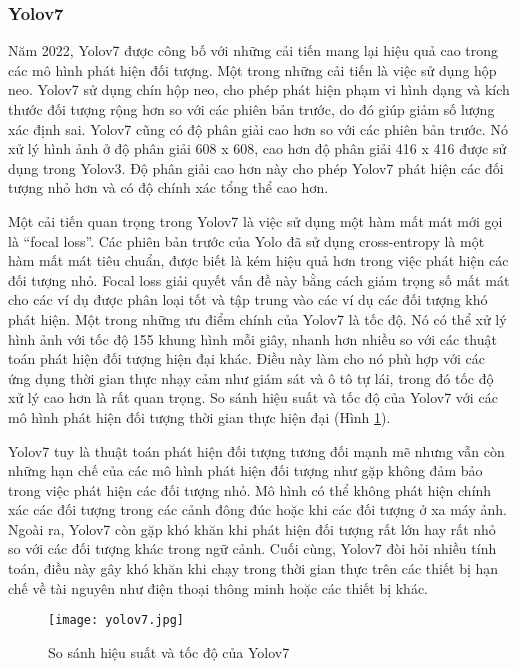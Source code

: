 \documentclass[../the.tex]{subfiles}
\begin{document}
\subsubsection{Yolov7} 
{\fontsize{13}{12} \selectfont 
Năm 2022, Yolov7 \cite{wang2022yolov7} được công bố với những cải tiến mang lại hiệu quả cao trong các mô hình phát hiện đối tượng. Một trong những cải tiến là việc sử dụng hộp neo.
Yolov7 sử dụng chín hộp neo, cho phép phát hiện phạm vi hình dạng và kích thước đối tượng rộng hơn so với các phiên bản trước, do đó giúp giảm số lượng xác định sai.
Yolov7 cũng có độ phân giải cao hơn so với các phiên bản trước. Nó xử lý hình ảnh ở độ phân giải 608 x 608, cao hơn độ phân giải 416 x 416 được sử dụng trong Yolov3. Độ phân giải cao hơn này cho phép Yolov7 phát hiện các đối tượng nhỏ hơn và có độ chính xác tổng thể cao hơn.

Một cải tiến quan trọng trong Yolov7 là việc sử dụng một hàm mất mát mới gọi là “focal loss”. Các phiên bản trước của Yolo đã sử dụng cross-entropy là một hàm mất mát tiêu chuẩn, được biết là kém hiệu quả hơn trong việc phát hiện các đối tượng nhỏ. Focal loss giải quyết vấn đề này bằng cách giảm trọng số mất mát cho các ví dụ được phân loại tốt và tập trung vào các ví dụ các đối tượng khó phát hiện.
Một trong những ưu điểm chính của Yolov7 là tốc độ. Nó có thể xử lý hình ảnh với tốc độ 155 khung hình mỗi giây, nhanh hơn nhiều so với các thuật toán phát hiện đối tượng hiện đại khác. Điều này làm cho nó phù hợp với các ứng dụng thời gian thực nhạy cảm như giám sát và ô tô tự lái, trong đó tốc độ xử lý cao hơn là rất quan trọng.
So sánh hiệu suất và tốc độ của Yolov7 với các mô hình phát hiện đối tượng thời gian thực hiện đại (Hình \ref{fig:yolov7}).
}
{\fontsize{13}{12} \selectfont 
Yolov7 tuy là thuật toán phát hiện đối tượng tương đối mạnh mẽ nhưng vẫn còn những hạn chế của các mô hình phát hiện đối tượng như gặp không đảm bảo trong việc phát hiện các đối tượng nhỏ. Mô hình có thể không phát hiện chính xác các đối tượng trong các cảnh đông đúc hoặc khi các đối tượng ở xa máy ảnh.
Ngoài ra, Yolov7 còn gặp khó khăn khi phát hiện đối tượng rất lớn hay rất nhỏ so với các đối tượng khác trong ngữ cảnh. Cuối cùng, Yolov7 đòi hỏi nhiều tính toán, điều này gây khó khăn khi chạy trong thời gian thực trên các thiết bị hạn chế về tài nguyên như điện thoại thông minh hoặc các thiết bị
khác.
}

\begin{figure}[H]
	\centering
	\texttt{[image: yolov7.jpg]}
	\caption{So sánh hiệu suất và tốc độ của Yolov7 \cite{wang2022yolov7}}
	\label{fig:yolov7}
\end{figure}
\bigskip
\end{document}
